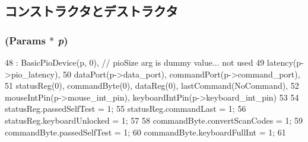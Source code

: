 \subsection{コンストラクタとデストラクタ}
\hypertarget{classX86ISA_1_1I8042_a46a61113522fbd1946d4f58441b939bf}{
\subsubsection[{I8042}]{ ({\bf Params} $\ast$ {\em p})}}
\label{classX86ISA_1_1I8042_a46a61113522fbd1946d4f58441b939bf}



\begin{DoxyCode}
48     : BasicPioDevice(p, 0), // pioSize arg is dummy value... not used
49       latency(p->pio_latency),
50       dataPort(p->data_port), commandPort(p->command_port),
51       statusReg(0), commandByte(0), dataReg(0), lastCommand(NoCommand),
52       mouseIntPin(p->mouse_int_pin), keyboardIntPin(p->keyboard_int_pin)
53 {
54     statusReg.passedSelfTest = 1;
55     statusReg.commandLast = 1;
56     statusReg.keyboardUnlocked = 1;
57 
58     commandByte.convertScanCodes = 1;
59     commandByte.passedSelfTest = 1;
60     commandByte.keyboardFullInt = 1;
61 }
\end{DoxyCode}


